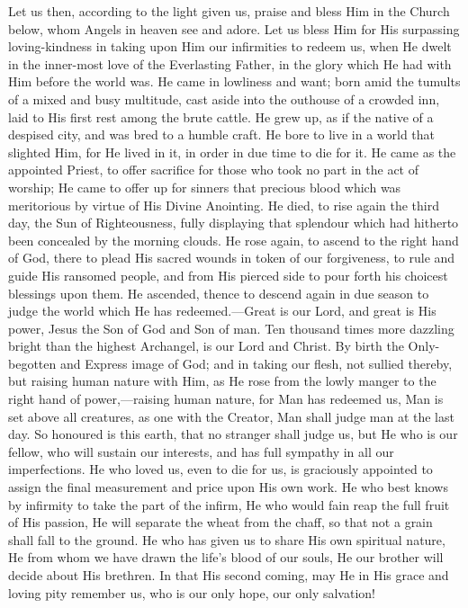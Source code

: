 Let us then, according to the light given us, praise and bless Him
in the Church below, whom Angels in heaven see and adore. Let us bless
Him for His surpassing loving-kindness in taking upon Him our
infirmities to redeem us, when He dwelt in the inner-most love of the
Everlasting Father, in the glory which He had with Him before the
world was. He came in lowliness and want; born amid the tumults of a
mixed and busy multitude, cast aside into the outhouse of a crowded
inn, laid to His first rest among the brute cattle. He grew up, as if
the native of a despised city, and was bred to a humble craft. He bore
to live in a world that slighted Him, for He lived in it, in order in
due time to die for it. He came as the appointed Priest, to offer
sacrifice for those who took no part in the act of worship; He came to
offer up for sinners that precious blood which was meritorious by
virtue of His Divine Anointing. He died, to rise again the third day,
the Sun of Righteousness, fully displaying that splendour which had
hitherto been concealed by the morning clouds. He rose again, to
ascend to the right hand of God, there to plead His sacred wounds in
token of our forgiveness, to rule and guide His ransomed people, and
from His pierced side to pour forth his choicest blessings upon them.
He ascended, thence to descend again in due season to judge the world
which He has redeemed.—Great is our Lord, and great is His power,
Jesus the Son of God and Son of man. Ten thousand times more dazzling
bright than the highest Archangel, is our Lord and Christ. By birth
the Only-begotten and Express image of God; and in taking our flesh,
not sullied thereby, but raising human nature with Him, as He rose
from the lowly manger to the right hand of power,—raising human
nature, for Man has redeemed us, Man is set above all creatures, as
one with the Creator, Man shall judge man at the last day. So honoured
is this earth, that no stranger shall judge us, but He who is our
fellow, who will sustain our interests, and has full sympathy in all
our imperfections. He who loved us, even to die for us, is graciously
appointed to assign the final measurement and price upon His own work.
He who best knows by infirmity to take the part of the infirm, He who
would fain reap the full fruit of His passion, He will separate the
wheat from the chaff, so that not a grain shall fall to the ground. He
who has given us to share His own spiritual nature, He from whom we
have drawn the life's blood of our souls, He our brother will decide
about His brethren. In that His second coming, may He in His grace and
loving pity remember us, who is our only hope, our only salvation!

